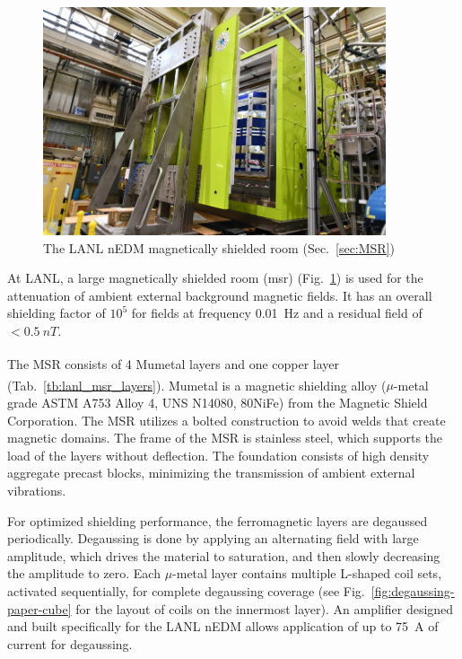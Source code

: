 \begin{figure}
    \centering
    \includegraphics[width=0.9\textwidth]{figures/completed_msr.jpg}
    \caption
    {The LANL nEDM magnetically shielded room (Sec.~\ref{sec:MSR})}
    \label{fig:MSR}
\end{figure}

At LANL, a large magnetically shielded room (\acrshort*{msr}) (Fig.~\ref{fig:MSR}) is used for the attenuation of ambient external background magnetic fields. It has an overall shielding factor of $10^5$ for fields at frequency \qty{0.01}{\hertz} and a residual field of $<\qty{0.5}{nT}$.

The MSR consists of 4 Mumetal\textsuperscript{\textregistered} layers and one copper layer (Tab.~\ref{tb:lanl_msr_layers}). Mumetal\textsuperscript{\textregistered} is a magnetic shielding alloy ($\mu$-metal grade ASTM A753 Alloy 4, UNS N14080, 80NiFe) from the Magnetic Shield Corporation. The MSR utilizes a bolted construction to avoid welds that create magnetic domains. The frame of the MSR is stainless steel, which supports the load of the layers without deflection. The foundation consists of high density aggregate precast blocks, minimizing the transmission of ambient external vibrations.

For optimized shielding performance, the ferromagnetic layers are degaussed periodically. Degaussing is done by applying an alternating field with large amplitude, which drives the material to saturation, and then slowly decreasing the amplitude to zero. Each $\mu$-metal layer contains multiple L-shaped coil sets, activated sequentially, for complete degaussing coverage (see Fig.~\ref{fig:degaussing-paper-cube} for the layout of coils on the innermost layer). An amplifier designed and built specifically for the LANL nEDM allows application of up to \qty{75}{A} of current for degaussing.

